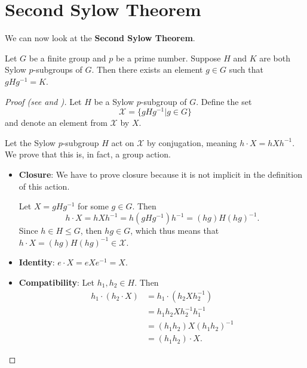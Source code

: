 \section{Second Sylow Theorem}
We can now look at the \textbf{Second Sylow Theorem}.
\begin{theorem}[Sylow II]\label{thrm-sylow-2}
    Let $G$ be a finite group and $p$ be a prime number. Suppose $H$ and $K$ are both Sylow $p$-subgroups of $G$. Then there exists an element $g \in G$ such that $gHg^{-1} = K$.
\end{theorem}
\begin{proof}[Proof (see {\cite[Theorem 11.10]{humphreys_1996}} and {\cite[pp.~3--5]{mann_2011}})]
    Let $H$ be a Sylow $p$-subgroup of $G$. Define the set
    \[
        \mathcal{X} = \{gHg^{-1} \vert g \in G\}
    \]
    and denote an element from $\mathcal{X}$ by $X$.

    Let the Sylow $p$-subgroup $H$ act on $\mathcal{X}$ by conjugation, meaning $h \cdot X = hXh^{-1}$. We prove that this is, in fact, a group action.
    
    \begin{itemize}
        \item \textbf{Closure}: We have to prove closure because it is not implicit in the definition of this action.

        Let $X = gHg^{-1}$ for some $g \in G$. Then
        \[
            h\cdot X = hXh^{-1} = h(gHg^{-1})h^{-1} = (hg)H(hg)^{-1}.
        \]
        Since $h \in H \leq G$, then $hg \in G$, which thus means that $h \cdot X = (hg)H(hg)^{-1} \in \mathcal{X}$.
        \item \textbf{Identity}: $e \cdot X = eXe^{-1} = X$.
        \item \textbf{Compatibility}: Let $h_1, h_2 \in H$. Then
        \begin{align*}
            h_1 \cdot (h_2 \cdot X) &= h_1 \cdot (h_2Xh_2^{-1})\\
            &= h_1h_2Xh_2^{-1}h_1^{-1}\\
            &= (h_1h_2)X(h_1h_2)^{-1}\\
            &= (h_1h_2) \cdot X.
        \end{align*}
    \end{itemize}


\end{proof}
